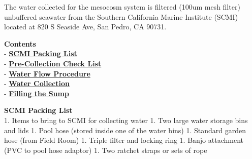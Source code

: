 \documentclass[]{book}
\begin{document}
The water collected for the mesocosm system is filtered (100um mesh
filter) unbuffered seawater from the Southern California Marine
Institute (SCMI) located at 820 S Seaside Ave, San Pedro, CA 90731.

\textbf{Contents}\\
- \protect\hyperlink{packing_list}{\textbf{SCMI Packing List}}\\
- \protect\hyperlink{check_list}{\textbf{Pre-Collection Check List}}\\
- \protect\hyperlink{water_flow}{\textbf{Water Flow Procedure}}\\
- \protect\hyperlink{water_collection}{\textbf{Water Collection}}\\
- \protect\hyperlink{filling_the_sump}{\textbf{Filling the Sump}}

 \textbf{SCMI Packing List}\\
1. Items to bring to SCMI for collecting water 1. Two large water
storage bins and lids 1. Pool hose (stored inside one of the water bins)
1. Standard garden hose (from Field Room) 1. Triple filter and locking
ring 1. Banjo attachment (PVC to pool hose adaptor) 1. Two ratchet
straps or sets of rope
\end{document}
